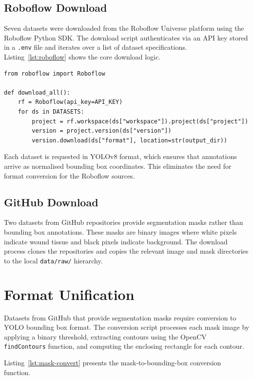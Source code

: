 \documentclass[a4paper,12pt,twoside]{report}
\begin{document}
\subsection{Roboflow Download}

Seven datasets were downloaded from the Roboflow Universe platform using the
Roboflow Python SDK. The download script authenticates via an API key stored in
a \texttt{.env} file and iterates over a list of dataset specifications.
Listing~\ref{lst:roboflow} shows the core download logic.

\begin{lstlisting}[caption={Core Roboflow download function.},
  label={lst:roboflow}]
from roboflow import Roboflow

def download_all():
    rf = Roboflow(api_key=API_KEY)
    for ds in DATASETS:
        project = rf.workspace(ds["workspace"]).project(ds["project"])
        version = project.version(ds["version"])
        version.download(ds["format"], location=str(output_dir))
\end{lstlisting}

Each dataset is requested in YOLOv8 format, which ensures that annotations
arrive as normalised bounding box coordinates. This eliminates the need for
format conversion for the Roboflow sources.

\subsection{GitHub Download}

Two datasets from GitHub repositories provide segmentation masks rather than
bounding box annotations. These masks are binary images where white pixels
indicate wound tissue and black pixels indicate background. The download
process clones the repositories and copies the relevant image and mask
directories to the local \texttt{data/raw/} hierarchy.

\section{Format Unification}
\label{sec:format-unification}

Datasets from GitHub that provide segmentation masks require conversion to YOLO
bounding box format. The conversion script processes each mask image by applying
a binary threshold, extracting contours using the OpenCV \texttt{findContours}
function, and computing the enclosing rectangle for each contour.

Listing~\ref{lst:mask-convert} presents the mask-to-bounding-box conversion
function.
\end{document}
